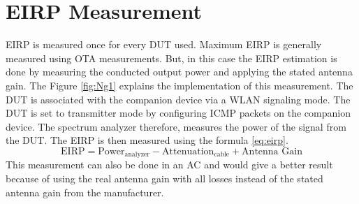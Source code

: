 \section{\acs{EIRP} Measurement}
\acs{EIRP} is measured once for every \acs{DUT} used. Maximum \acs{EIRP} is generally measured using \acs{OTA} measurements.  But, in this case the \acs{EIRP} estimation is done by measuring the conducted output power and applying the stated antenna gain. The Figure \ref{fig:Ng1} explains the implementation of this measurement. The \acs{DUT} is associated with the companion device via a \acs{WLAN} signaling mode. The \acs{DUT} is set to transmitter mode by configuring \acs{ICMP} packets on the companion device. The spectrum analyzer therefore, measures the power of the signal from the \acs{DUT}. The \acs{EIRP} is then measured using the formula \ref{eq:eirp}.
\begin{equation}
\mbox{EIRP}  = \mbox{Power}_{\mbox{analyzer}} - \mbox{Attenuation}_{\mbox{cable}} + \mbox{Antenna Gain} \label{eq:eirp}
\end{equation}
This measurement can also be done in an \acf{AC} and would give a better result because of using the real antenna gain with all losses instead of the stated antenna gain from the manufacturer.

